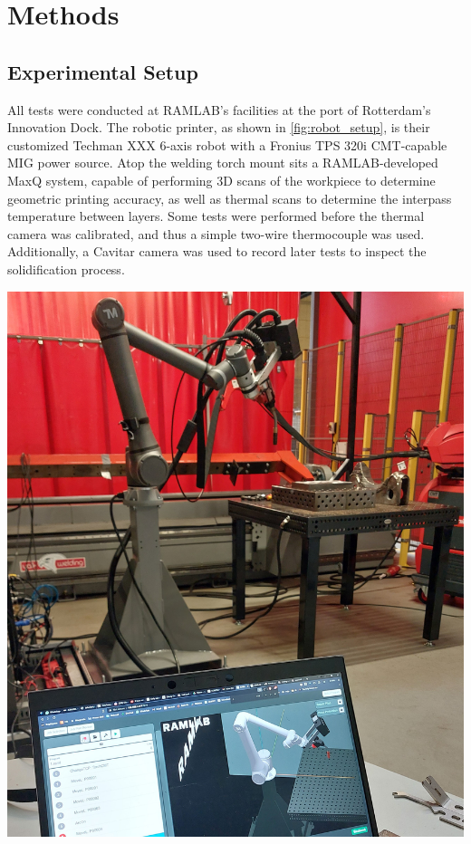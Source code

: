 \section{Methods}

\subsection{Experimental Setup}

All tests were conducted at RAMLAB's facilities at the port of Rotterdam's Innovation Dock. The robotic printer, as shown in \autoref{fig:robot_setup}, is their customized Techman XXX 6-axis robot with a Fronius TPS 320i CMT-capable MIG power source.
Atop the welding torch mount sits a RAMLAB-developed MaxQ system, capable of performing 3D scans of the workpiece to determine geometric printing accuracy, as well as thermal scans to determine the interpass temperature between layers. Some tests were performed before the thermal camera was calibrated, and thus a simple two-wire thermocouple was used.
Additionally, a Cavitar camera was used to record later tests to inspect the solidification process.

\begin{minipage}{\linewidth}
      \centering
      \includegraphics[width=\linewidth]{images/robot_setup.jpg}
      \label{fig:robot_setup}
  \end{minipage}

